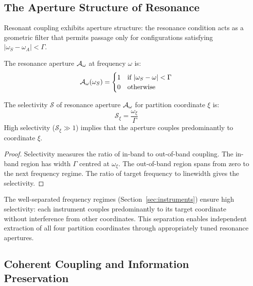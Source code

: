 \subsection{The Aperture Structure of Resonance}

Resonant coupling exhibits aperture structure: the resonance condition acts as a geometric filter that permits passage only for configurations satisfying $|\omega_S - \omega_A| < \Gamma$.

\begin{definition}
\label{def:resonance_aperture}
The resonance aperture $\mathcal{A}_\omega$ at frequency $\omega$ is:
\begin{equation}
\mathcal{A}_\omega(\omega_S) = \begin{cases}
1 & \text{if } |\omega_S - \omega| < \Gamma \\
0 & \text{otherwise}
\end{cases}
\end{equation}
\end{definition}

\begin{theorem}
\label{thm:aperture_selectivity}
The selectivity $\mathcal{S}$ of resonance aperture $\mathcal{A}_\omega$ for partition coordinate $\xi$ is:
\begin{equation}
\mathcal{S}_\xi = \frac{\omega_\xi}{\Gamma}
\end{equation}
High selectivity ($\mathcal{S}_\xi \gg 1$) implies that the aperture couples predominantly to coordinate $\xi$.
\end{theorem}

\begin{proof}
Selectivity measures the ratio of in-band to out-of-band coupling. The in-band region has width $\Gamma$ centred at $\omega_\xi$. The out-of-band region spans from zero to the next frequency regime. The ratio of target frequency to linewidth gives the selectivity.
\end{proof}

The well-separated frequency regimes (Section~\ref{sec:instruments}) ensure high selectivity: each instrument couples predominantly to its target coordinate without interference from other coordinates. This separation enables independent extraction of all four partition coordinates through appropriately tuned resonance apertures.

\subsection{Coherent Coupling and Information Preservation}

